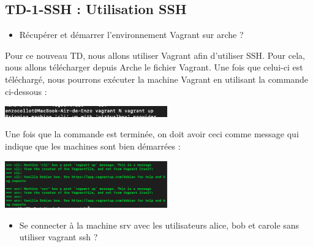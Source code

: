 \documentclass[12pt]{article}
\begin{document}
  \subsection{TD-1-SSH : Utilisation SSH}

\begin{itemize}
  \item Récupérer et démarrer l'environnement Vagrant sur arche ?
\end{itemize}

\vspace{0.3cm}

Pour ce nouveau TD, nous allons utiliser Vagrant afin d'utiliser SSH. Pour cela, nous allons télécharger depuis Arche le fichier Vagrant. Une fois que celui-ci est téléchargé, nous pourrons exécuter la machine Vagrant en utilisant la commande ci-dessous :

\vspace{0.3cm}

\begin{center}
  \includegraphics[width=7cm]{Images-Client-SSH/Image-TD-SSH-1/vagrant_up.png}
\end{center}

\vspace{0.3cm}

Une fois que la commande est terminée, on doit avoir ceci comme message qui indique que les machines sont bien démarrées :  

\vspace{0.3cm}

\begin{center}
  \includegraphics[width=7cm]{Images-Client-SSH/Image-TD-SSH-1/Machine.png}
\end{center}

\vspace{0.3cm}

\begin{itemize}
  \item Se connecter à la machine srv avec les utilisateurs alice, bob et carole sans utiliser vagrant ssh ?
\end{itemize}

\vspace{0.3cm}
\end{document}
